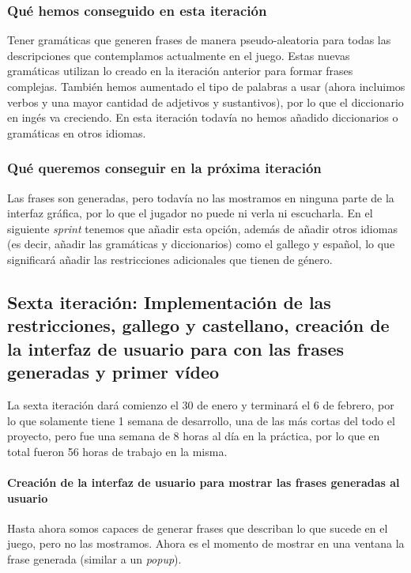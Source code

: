 \subsubsection{Qué hemos conseguido en esta iteración}

Tener gramáticas que generen frases de manera pseudo-aleatoria para todas las descripciones que contemplamos actualmente en el juego. Estas nuevas gramáticas utilizan lo creado en la iteración anterior para formar frases complejas. También hemos aumentado el tipo de palabras a usar (ahora incluimos verbos y una mayor cantidad de adjetivos y sustantivos), por lo que el diccionario en ingés va creciendo. En esta iteración todavía no hemos añadido diccionarios o gramáticas en otros idiomas.

\subsubsection{Qué queremos conseguir en la próxima iteración}

Las frases son generadas, pero todavía no las mostramos en ninguna parte de la interfaz gráfica, por lo que el jugador no puede ni verla ni escucharla. En el siguiente \textit{sprint} tenemos que añadir esta opción, además de añadir otros idiomas (es decir, añadir las gramáticas y diccionarios) como el gallego y español, lo que significará añadir las restricciones adicionales que tienen de género.

\subsection{Sexta iteración: Implementación de las restricciones, gallego y castellano, creación de la interfaz de usuario para con las frases generadas y primer vídeo}

La sexta iteración dará comienzo el 30 de enero y terminará el 6 de febrero, por lo que solamente tiene 1 semana de desarrollo, una de las más cortas del todo el proyecto, pero fue una semana de 8 horas al día en la práctica, por lo que en total fueron 56 horas de trabajo en la misma.

\paragraph{Creación de la interfaz de usuario para mostrar las frases generadas al usuario} Hasta ahora somos capaces de generar frases que describan lo que sucede en el juego, pero no las mostramos. Ahora es el momento de mostrar en una ventana la frase generada (similar a un \textit{popup}).


